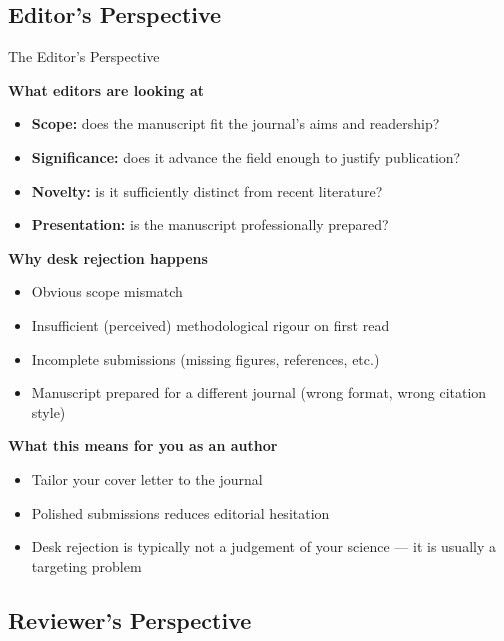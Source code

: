 \documentclass{beamer}
\begin{document}

\subsection{Editor's Perspective}

\begin{frame}{The Editor's Perspective}

  \footnotesize
  \textbf{What editors are looking at}
  \begin{itemize}
    \item \textbf{Scope:} does the manuscript fit the journal's
      aims and readership?
    \item \textbf{Significance:} does it advance the field enough
      to justify publication?
    \item \textbf{Novelty:} is it sufficiently distinct from
      recent literature?
    \item \textbf{Presentation:} is the manuscript professionally
      prepared?
  \end{itemize}

  \medskip
  \textbf{Why desk rejection happens}
  \begin{itemize}
    \item Obvious scope mismatch
    \item Insufficient (perceived) methodological rigour on first read
    \item Incomplete submissions (missing figures, references, etc.)
    \item Manuscript prepared for a different journal
      (wrong format, wrong citation style)
  \end{itemize}

  \medskip
  \textbf{What this means for you as an author}
  \begin{itemize}
    \item Tailor your cover letter to the journal
    \item Polished submissions reduces editorial hesitation
    \item Desk rejection is typically not a judgement of your science ---
      it is usually a targeting problem
  \end{itemize}

\end{frame}


\subsection{Reviewer's Perspective}
\end{document}
